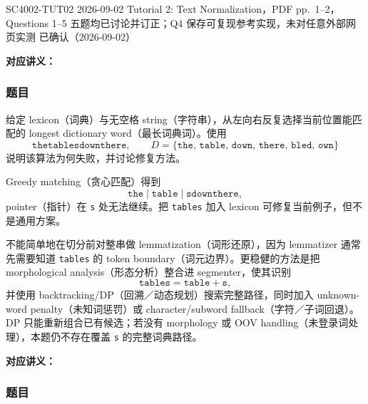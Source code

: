 
\label{tutorial:SC4002-TUT02}

\tutorialmeta
  {SC4002-TUT02}
  {2026-09-02}
  {Tutorial 2: Text Normalization，PDF pp.~1--2，Questions 1--5}
  {五题均已讨论并订正；Q4 保存可复现参考实现，未对任意外部网页实测}
  {已确认（2026-09-02）}


\textbf{对应讲义：}

\subsubsection*{题目}

给定 lexicon（词典）与无空格 string（字符串），从左向右反复选择当前位置能匹配的 longest dictionary word（最长词典词）。使用
\[
  \texttt{thetablesdownthere},
  \qquad
  D=\{\texttt{the, table, down, there, bled, own}\}
\]
说明该算法为何失败，并讨论修复方法。

\begin{checkedsolution}
Greedy matching（贪心匹配）得到
\[
  \texttt{the}\mid\texttt{table}\mid\texttt{sdownthere},
\]
pointer（指针）在 \texttt{s} 处无法继续。把 \texttt{tables} 加入 lexicon 可修复当前例子，但不是通用方案。

不能简单地在切分前对整串做 lemmatization（词形还原），因为 lemmatizer 通常先需要知道 \texttt{tables} 的 token boundary（词元边界）。更稳健的方法是把 morphological analysis（形态分析）整合进 segmenter，使其识别
\[
  \texttt{tables}=\texttt{table}+\texttt{s},
\]
并使用 backtracking/DP（回溯／动态规划）搜索完整路径，同时加入 unknown-word penalty（未知词惩罚）或 character/subword fallback（字符／子词回退）。DP 只能重新组合已有候选；若没有 morphology 或 OOV handling（未登录词处理），本题仍不存在覆盖 \texttt{s} 的完整词典路径。
\end{checkedsolution}


\textbf{对应讲义：}

\subsubsection*{题目}

